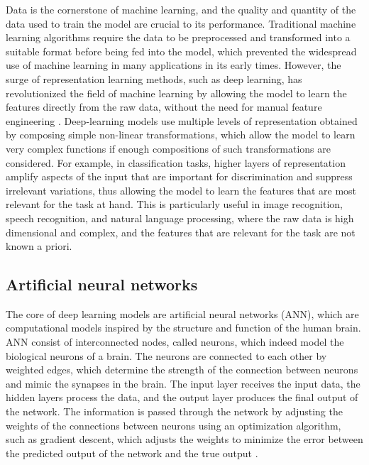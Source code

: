 Data is the cornerstone of machine learning, and the quality and quantity of
the data used to train the model are crucial to its performance. Traditional
machine learning algorithms require the data to be preprocessed and
transformed into a suitable format before being fed into the model, which
prevented the widespread use of machine learning in many applications in its
early times. However, the surge of representation learning methods, such as
deep learning, has revolutionized the field of machine learning by allowing the
model to learn the features directly from the raw data, without the need for
manual feature engineering \cite{LeCun2015}. Deep-learning models use multiple
levels of representation obtained by composing simple non-linear
transformations, which allow the model to learn very complex functions if
enough compositions of such transformations are considered. For example, in
classification tasks, higher layers of representation amplify aspects of the
input that are important for discrimination and suppress irrelevant variations,
thus allowing the model to learn the features that are most relevant for the
task at hand. This is particularly useful in image recognition, speech
recognition, and natural language processing, where the raw data is high
dimensional and complex, and the features that are relevant for the task are
not known a priori.

\subsection{\label{sec:Artificial neural networks} Artificial neural networks}

The core of deep learning models are artificial neural networks (ANN), which
are computational models inspired by the structure and function of the human
brain. ANN consist of interconnected nodes, called neurons, which indeed model
the biological neurons of a brain. The neurons are connected to each other by
weighted edges, which determine the strength of the connection between neurons
and mimic the synapses in the brain. The input layer receives the input data,
the hidden layers process the data, and the output layer produces the final
output of the network. The information is passed through the network by
adjusting the weights of the connections between neurons using an optimization
algorithm, such as gradient descent, which adjusts the weights to minimize the
error between the predicted output of the network and the true output
\cite{Goodfellow2016}.

